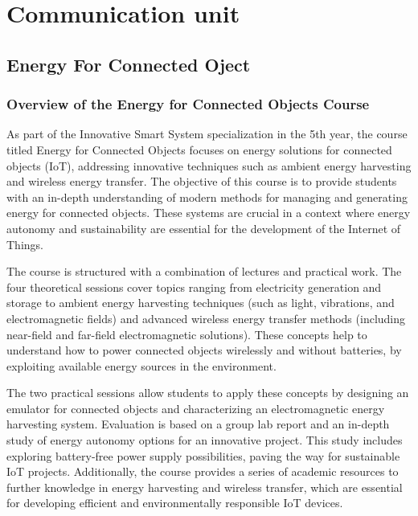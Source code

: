 \chapter{Communication unit}
\thispagestyle{fancy}


\section{Energy For Connected Oject}

\subsection{Overview of the Energy for Connected Objects Course}

As part of the Innovative Smart System specialization in the 5th year, the course titled Energy for Connected Objects focuses on energy solutions for connected objects (IoT), addressing innovative techniques such as ambient energy harvesting and wireless energy transfer. The objective of this course is to provide students with an in-depth understanding of modern methods for managing and generating energy for connected objects. These systems are crucial in a context where energy autonomy and sustainability are essential for the development of the Internet of Things.

The course is structured with a combination of lectures and practical work. The four theoretical sessions cover topics ranging from electricity generation and storage to ambient energy harvesting techniques (such as light, vibrations, and electromagnetic fields) and advanced wireless energy transfer methods (including near-field and far-field electromagnetic solutions). These concepts help to understand how to power connected objects wirelessly and without batteries, by exploiting available energy sources in the environment.

The two practical sessions allow students to apply these concepts by designing an emulator for connected objects and characterizing an electromagnetic energy harvesting system. Evaluation is based on a group lab report and an in-depth study of energy autonomy options for an innovative project. This study includes exploring battery-free power supply possibilities, paving the way for sustainable IoT projects. Additionally, the course provides a series of academic resources to further knowledge in energy harvesting and wireless transfer, which are essential for developing efficient and environmentally responsible IoT devices.


